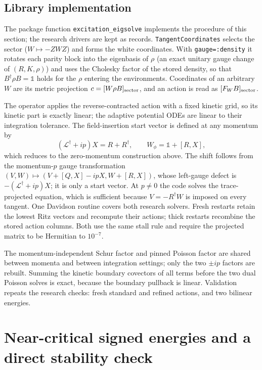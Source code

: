 \documentclass[11pt]{article}
\newcommand{\Id}{\mathbb{1}}
\begin{document}
\subsection{Library implementation}
The package function \texttt{excitation\_eigsolve} implements the procedure of this
section; the research drivers are kept as records. \texttt{TangentCoordinates}
selects the sector ($W\mapsto-ZWZ$) and forms the white coordinates. With
\texttt{gauge=:density} it rotates each parity block into the eigenbasis of $\rho$
(an exact unitary gauge change of $(R,K,\rho)$) and uses the Cholesky factor of the
stored density, so that $B^\dagger\rho B=\Id$ holds for the $\rho$ entering the
environments. Coordinates of an arbitrary $W$ are its metric projection
$c=[W\rho B]_{\rm sector}$, and an action is read as $[F_WB]_{\rm sector}$.

The operator applies the reverse-contracted action with a fixed kinetic grid, so its
kinetic part is exactly linear; the adaptive potential ODEs are linear to their
integration tolerance. The field-insertion start vector is defined at any momentum by
\begin{equation}
 (\mathcal L^\dagger+ip)X=R+R^\dagger,\qquad W_\phi=\Id+[R,X],
\end{equation}
which reduces to the zero-momentum construction above. The shift follows from the
momentum-$p$ gauge transformation $(V,W)\mapsto(V+[Q,X]-ipX,W+[R,X])$, whose
left-gauge defect is $-(\mathcal L^\dagger+ip)X$; it is only a start vector. At $p\neq0$ the code solves the trace-projected equation, which is sufficient
because $V=-R^\dagger W$ is imposed on every tangent. One Davidson routine covers
both research solvers. Fresh restarts retain the lowest Ritz vectors and recompute
their actions; thick restarts recombine the stored action columns. Both use the same
stall rule and require the projected matrix to be Hermitian to $10^{-7}$.

The momentum-independent Schur factor and pinned Poisson factor are shared between
momenta and between integration settings; only the two $\pm ip$ factors are rebuilt.
Summing the kinetic boundary covectors of all terms before the two dual Poisson
solves is exact, because the boundary pullback is linear. Validation repeats the
research checks: fresh standard and refined actions, and two bilinear energies.

\section{Near-critical signed energies and a direct stability check}
\end{document}
